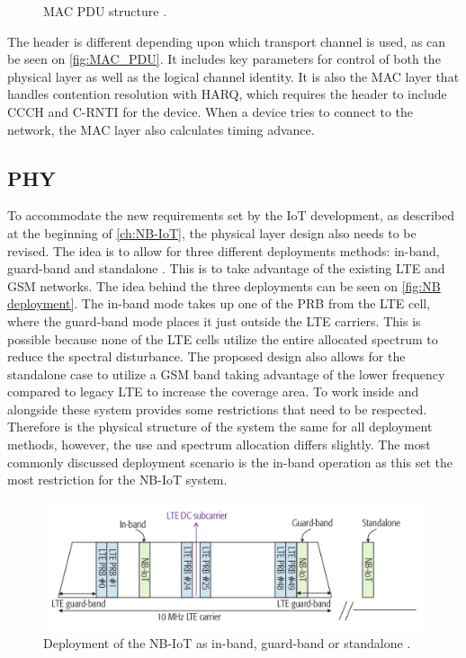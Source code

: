 \begin{figure}[H]
\centering
\resizebox{\textwidth}{!}{
}
\caption{MAC PDU structure \citep[Sec. 6.3]{book_LTE_for_UMTS}.}
\label{fig:MAC_PDU}
\end{figure}

The header is different depending upon which transport channel is used, as can be seen on \autoref{fig:MAC_PDU}. It includes key parameters for control of both the physical layer as well as the logical channel identity. It is also the \gls{MAC} layer that handles contention resolution with \gls{HARQ}, which requires the header to include \gls{CCCH} and \gls{C-RNTI} for the device. When a device tries to connect to the network, the \gls{MAC} layer also calculates timing advance. \citep[Sec. 6.3]{book_LTE_for_UMTS}


\subsection{PHY}\label{sec:NB-IoT/Physical Layer}

To accommodate the new requirements set by the \gls{IoT} development, as described at the beginning of \autoref{ch:NB-IoT}, the physical layer design also needs to be revised. The idea is to allow for three different deployments methods: in-band, guard-band and standalone \citep{primer}. This is to take advantage of the existing \gls{LTE} and \gls{GSM} networks. The idea behind the three deployments can be seen on \autoref{fig:NB deployment}. The in-band mode takes up one of the \gls{PRB} from the \gls{LTE} cell, where the guard-band mode places it just outside the LTE carriers. This is possible because none of the \gls{LTE} cells utilize the entire allocated spectrum to reduce the spectral disturbance. The proposed design also allows for the standalone case to utilize a \gls{GSM} band taking advantage of the lower frequency compared to legacy \gls{LTE} to increase the coverage area. To work inside and alongside these system provides some restrictions that need to be respected. Therefore is the physical structure of the system the same for all deployment methods, however, the use and spectrum allocation differs slightly. The most commonly discussed deployment scenario is the in-band operation as this set the most restriction for the \gls{NB-IoT} system. \citep{REL-13,primer}

\begin{figure}[H]
\centering
\includegraphics[width=\textwidth]{figures/deployment.png}
\caption{Deployment of the NB-IoT as in-band, guard-band or standalone \citep{primer}.}
\label{fig:NB deployment}
\end{figure}


